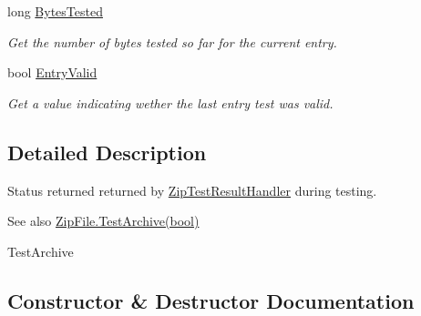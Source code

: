 \begin{DoxyCompactItemize}
long \hyperlink{class_i_c_sharp_code_1_1_sharp_zip_lib_1_1_zip_1_1_test_status_a12406588b12f3cfe2566c3969181b656}{Bytes\+Tested}
\begin{DoxyCompactList}\small\item\em Get the number of bytes tested so far for the current entry. \end{DoxyCompactList}\item 
bool \hyperlink{class_i_c_sharp_code_1_1_sharp_zip_lib_1_1_zip_1_1_test_status_aef4b05c317e511bc86342528856e35c1}{Entry\+Valid}
\begin{DoxyCompactList}\small\item\em Get a value indicating wether the last entry test was valid. \end{DoxyCompactList}\end{DoxyCompactItemize}


\subsection{Detailed Description}
Status returned returned by \hyperlink{namespace_i_c_sharp_code_1_1_sharp_zip_lib_1_1_zip_a80ec37fb8220f68e710a9beff884a743}{Zip\+Test\+Result\+Handler} during testing. 

\begin{DoxySeeAlso}{See also}
\hyperlink{class_i_c_sharp_code_1_1_sharp_zip_lib_1_1_zip_1_1_zip_file_ad56b307a8abbf5d68330e0ffe0a0d007}{Zip\+File.\+Test\+Archive(bool)}


\end{DoxySeeAlso}
Test\+Archive

\subsection{Constructor \& Destructor Documentation}
\mbox{\label{class_i_c_sharp_code_1_1_sharp_zip_lib_1_1_zip_1_1_test_status_a0e0dbade99e7914a64cfc580cbe87ba6}} 
